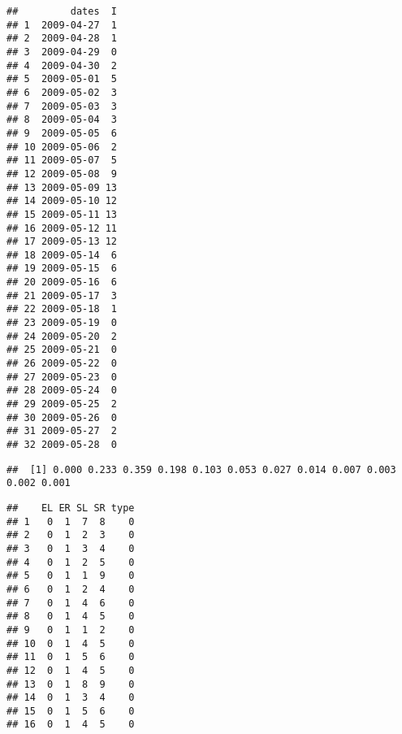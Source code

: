 \documentclass[
]{article}
\newenvironment{Shaded}{\begin{snugshade}}{\end{snugshade}}
\newcommand{\DocumentationTok}[1]{\textcolor[rgb]{0.56,0.35,0.01}{\textbf{\textit{#1}}}}
\newcommand{\NormalTok}[1]{#1}
\newcommand{\SpecialCharTok}[1]{\textcolor[rgb]{0.81,0.36,0.00}{\textbf{#1}}}
\begin{document}
\begin{verbatim}
##         dates  I
## 1  2009-04-27  1
## 2  2009-04-28  1
## 3  2009-04-29  0
## 4  2009-04-30  2
## 5  2009-05-01  5
## 6  2009-05-02  3
## 7  2009-05-03  3
## 8  2009-05-04  3
## 9  2009-05-05  6
## 10 2009-05-06  2
## 11 2009-05-07  5
## 12 2009-05-08  9
## 13 2009-05-09 13
## 14 2009-05-10 12
## 15 2009-05-11 13
## 16 2009-05-12 11
## 17 2009-05-13 12
## 18 2009-05-14  6
## 19 2009-05-15  6
## 20 2009-05-16  6
## 21 2009-05-17  3
## 22 2009-05-18  1
## 23 2009-05-19  0
## 24 2009-05-20  2
## 25 2009-05-21  0
## 26 2009-05-22  0
## 27 2009-05-23  0
## 28 2009-05-24  0
## 29 2009-05-25  2
## 30 2009-05-26  0
## 31 2009-05-27  2
## 32 2009-05-28  0
\end{verbatim}

\begin{Shaded}
\end{Shaded}

\begin{verbatim}
##  [1] 0.000 0.233 0.359 0.198 0.103 0.053 0.027 0.014 0.007 0.003 0.002 0.001
\end{verbatim}

\begin{Shaded}
\end{Shaded}

\begin{verbatim}
##    EL ER SL SR type
## 1   0  1  7  8    0
## 2   0  1  2  3    0
## 3   0  1  3  4    0
## 4   0  1  2  5    0
## 5   0  1  1  9    0
## 6   0  1  2  4    0
## 7   0  1  4  6    0
## 8   0  1  4  5    0
## 9   0  1  1  2    0
## 10  0  1  4  5    0
## 11  0  1  5  6    0
## 12  0  1  4  5    0
## 13  0  1  8  9    0
## 14  0  1  3  4    0
## 15  0  1  5  6    0
## 16  0  1  4  5    0
\end{verbatim}
\end{document}
